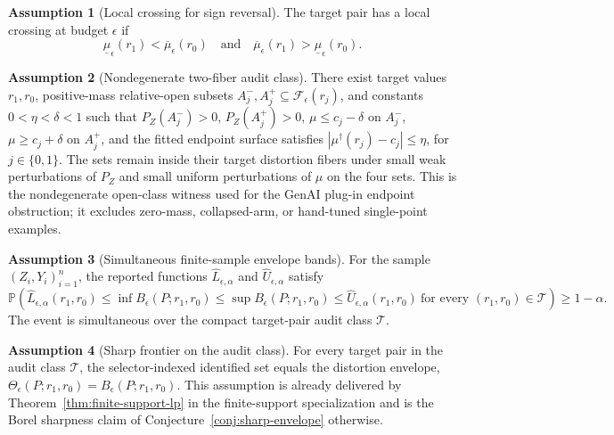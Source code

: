 \documentclass[11pt]{article}
\renewcommand{\Pr}{\mathbb{P}}
\theoremstyle{definition}
\newtheorem{assumption}{Assumption}
\theoremstyle{plain}
\theoremstyle{remark}
\begin{document}
\begin{assumption}[Local crossing for sign reversal]\label{ass:local-crossing}
The target pair has a local crossing at budget \(\epsilon\) if
\[
\underline\mu_\epsilon(r_1)
<
\overline\mu_\epsilon(r_0)
\quad\text{and}\quad
\overline\mu_\epsilon(r_1)
>
\underline\mu_\epsilon(r_0).
\]
\end{assumption}

\begin{assumption}[Nondegenerate two-fiber audit class]\label{ass:two-fiber-open}
There exist target values \(r_1,r_0\), positive-mass relative-open subsets \(A_j^-,A_j^+\subseteq\mathcal F_\epsilon(r_j)\), and constants \(0<\eta<\delta<1\) such that \(P_Z(A_j^-)>0\), \(P_Z(A_j^+)>0\), \(\mu\le c_j-\delta\) on \(A_j^-\), \(\mu\ge c_j+\delta\) on \(A_j^+\), and the fitted endpoint surface satisfies \(|\mu^\dagger(r_j)-c_j|\le\eta\), for \(j\in\{0,1\}\).  The sets remain inside their target distortion fibers under small weak perturbations of \(P_Z\) and small uniform perturbations of \(\mu\) on the four sets.  This is the nondegenerate open-class witness used for the GenAI plug-in endpoint obstruction; it excludes zero-mass, collapsed-arm, or hand-tuned single-point examples.
\end{assumption}

\begin{assumption}[Simultaneous finite-sample envelope bands]\label{ass:simul-bands}
For the sample \((Z_i,Y_i)_{i=1}^n\), the reported functions \(\widehat L_{\epsilon,\alpha}\) and \(\widehat U_{\epsilon,\alpha}\) satisfy
\[
\Pr\!\left(
  \widehat L_{\epsilon,\alpha}(r_1,r_0)
  \le
  \inf B_\epsilon(P;r_1,r_0)
  \le
  \sup B_\epsilon(P;r_1,r_0)
  \le
  \widehat U_{\epsilon,\alpha}(r_1,r_0)
  \ \text{for every }(r_1,r_0)\in\mathcal T
\right)\ge 1-\alpha .
\]
The event is simultaneous over the compact target-pair audit class \(\mathcal T\).
\end{assumption}

\begin{assumption}[Sharp frontier on the audit class]\label{ass:sharp-frontier}
For every target pair in the audit class \(\mathcal T\), the selector-indexed identified set equals the distortion envelope, \(\Theta_\epsilon(P;r_1,r_0)=B_\epsilon(P;r_1,r_0)\).  This assumption is already delivered by Theorem~\ref{thm:finite-support-lp} in the finite-support specialization and is the Borel sharpness claim of Conjecture~\ref{conj:sharp-envelope} otherwise.
\end{assumption}
\end{document}
